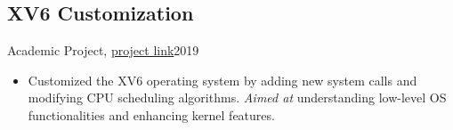 \subsection{XV6 Customization}{Academic Project, \href{https://github.com/Danial-Kord/XV6}{project link}}{2019}
\begin{itemize}
    \item Customized the XV6 operating system by adding new system calls and modifying CPU scheduling algorithms. \emph{Aimed at} understanding low-level OS functionalities and enhancing kernel features.
\end{itemize}
